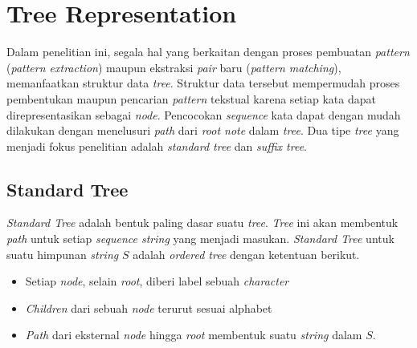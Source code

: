 \section{Tree Representation} 
Dalam penelitian ini, segala hal yang berkaitan dengan proses pembuatan \textit{pattern} (\textit{pattern extraction}) maupun ekstraksi \textit{pair} baru (\textit{pattern matching}), memanfaatkan struktur data \textit{tree}. Struktur data tersebut mempermudah proses pembentukan maupun pencarian \textit{pattern} tekstual karena setiap kata dapat direpresentasikan sebagai \textit{node}. Pencocokan \textit{sequence} kata dapat dengan mudah dilakukan dengan menelusuri \textit{path} dari \textit{root note} dalam \textit{tree}. Dua tipe \textit{tree} yang menjadi fokus penelitian adalah \textit{standard tree} dan \textit{suffix tree}.

\subsection{Standard Tree} \label{sec:tree}
\textit{Standard Tree} adalah bentuk paling dasar suatu \textit{tree}. \textit{Tree} ini akan membentuk \textit{path} untuk setiap \textit{sequence string} yang menjadi masukan. \textit{Standard Tree} untuk suatu himpunan \textit{string} $S$ adalah \textit{ordered tree} dengan ketentuan berikut.
\begin{itemize}
  \item Setiap \textit{node}, selain \textit{root}, diberi label sebuah \textit{character}
  \item \textit{Children} dari sebuah \textit{node} terurut sesuai alphabet
  \item \textit{Path} dari eksternal \textit{node} hingga \textit{root} membentuk suatu \textit{string} dalam $S$.
\end{itemize}

